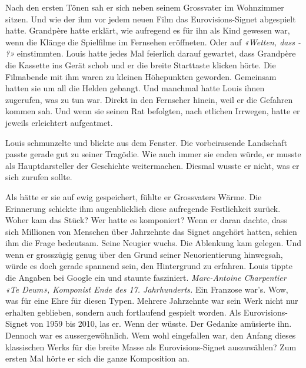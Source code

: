 Nach den ersten Tönen sah er sich neben seinem Grossvater im Wohnzimmer
sitzen. Und wie der ihm vor jedem neuen Film das Eurovisions-Signet
abgespielt hatte. Grandpère hatte erklärt, wie aufregend es für ihn als
Kind gewesen war, wenn die Klänge die Spielfilme im Fernsehen
eröffneten. Oder auf \emph{«Wetten, dass - ?»} einstimmten. Louis
hatte jedes Mal feierlich darauf gewartet, dass Grandpère 
die Kassette ins Gerät schob und er die breite Starttaste klicken hörte. Die
Filmabende mit ihm waren zu kleinen Höhepunkten geworden. Gemeinsam
hatten sie um all die Helden gebangt. Und manchmal hatte Louis ihnen
zugerufen, was zu tun war. Direkt in den Fernseher hinein, weil er die
Gefahren kommen sah. Und wenn sie seinen Rat befolgten, nach etlichen
Irrwegen, hatte er jeweils erleichtert aufgeatmet.

Louis schmunzelte und blickte aus dem Fenster. Die vorbeirasende
Landschaft passte gerade gut zu seiner Tragödie. Wie auch immer sie
enden würde, er musste als Hauptdarsteller der Geschichte weitermachen.
Diesmal wusste er nicht, was er sich zurufen sollte. 

Als hätte er sie auf ewig gespeichert, fühlte er Grossvaters Wärme. Die
Erinnerung schickte ihm augenblicklich diese 
aufregende Festlichkeit zurück. Woher kam das Stück? Wer hatte es
komponiert? Wenn er daran dachte, dass sich Millionen von Menschen über
Jahrzehnte das Signet angehört hatten, schien ihm die Frage bedeutsam.
Seine Neugier wuchs. Die Ablenkung kam gelegen. Und wenn er grosszügig genug über den Grund seiner Neuorientierung hinwegsah, würde es doch gerade spannend sein, den Hintergrund zu erfahren.
Louis tippte die Angaben bei Google ein und staunte fasziniert.
\emph{Marc-Antoine Charpentier «Te Deum», Komponist Ende des 17.
Jahrhunderts.} Ein Franzose war’s. Wow, was für eine Ehre für diesen
Typen. Mehrere Jahrzehnte war sein Werk nicht nur erhalten geblieben,
sondern auch fortlaufend gespielt worden. Als Eurovisions-Signet von
1959 bis 2010, las er. Wenn der wüsste. Der Gedanke amüsierte ihn. Dennoch war
es aussergewöhnlich. Wem wohl eingefallen war, den Anfang dieses
klassischen Werks für die breite Masse als Eurovisions-Signet
auszuwählen? Zum ersten Mal hörte er sich die ganze Komposition an. 



